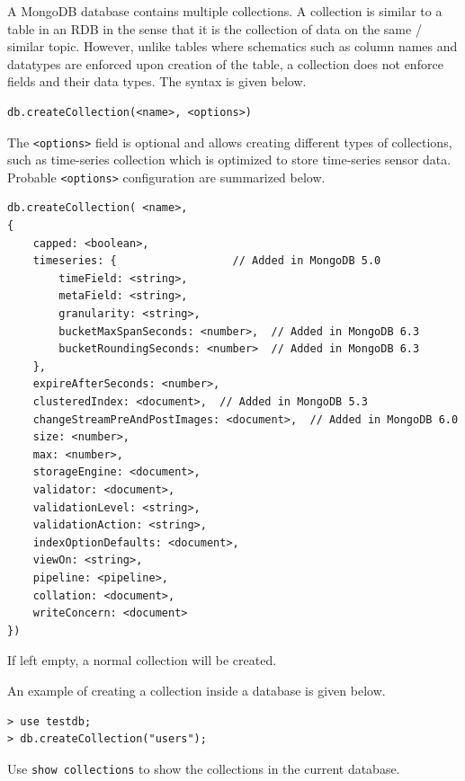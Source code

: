 A MongoDB database contains multiple collections. A collection is similar to a table in an RDB in the sense that it is the collection of data on the same / similar topic. However, unlike tables where schematics such as column names and datatypes are enforced upon creation of the table, a collection does not enforce fields and their data types. The syntax is given below.
\begin{lstlisting}
db.createCollection(<name>, <options>)
\end{lstlisting}

The \verb|<options>| field is optional and allows creating different types of collections, such as time-series collection which is optimized to store time-series sensor data. Probable \verb|<options>| configuration are summarized below.
\begin{lstlisting}
db.createCollection( <name>,
{
	capped: <boolean>,
	timeseries: {                  // Added in MongoDB 5.0
		timeField: <string>,
		metaField: <string>,
		granularity: <string>,
		bucketMaxSpanSeconds: <number>,  // Added in MongoDB 6.3
		bucketRoundingSeconds: <number>  // Added in MongoDB 6.3
	},
	expireAfterSeconds: <number>,
	clusteredIndex: <document>,  // Added in MongoDB 5.3
	changeStreamPreAndPostImages: <document>,  // Added in MongoDB 6.0
	size: <number>,
	max: <number>,
	storageEngine: <document>,
	validator: <document>,
	validationLevel: <string>,
	validationAction: <string>,
	indexOptionDefaults: <document>,
	viewOn: <string>,
	pipeline: <pipeline>,
	collation: <document>,
	writeConcern: <document>
})
\end{lstlisting}
If left empty, a normal collection will be created.

An example of creating a collection inside a database is given below.
\begin{lstlisting}
> use testdb;
> db.createCollection("users");
\end{lstlisting}
Use \verb|show collections| to show the collections in the current database.

